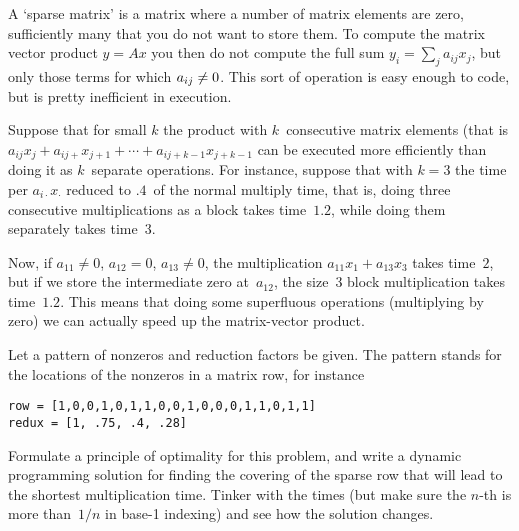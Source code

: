 A `sparse matrix' is a matrix where a number of matrix elements are
zero, sufficiently many that you do not want to store them.
To compute the matrix vector product $y=Ax$ you then do not compute
the full sum $y_i=\sum_j a_{ij}x_j$, but only those terms for which
$a_{ij}\not=\nobreak 0$. This sort of operation is easy enough to
code, but is pretty inefficient in execution.

Suppose that for small $k$ the product with $k$~consecutive matrix
elements (that is
$a_{ij}x_j+a_{ij+}x_{j+1}+\cdots+a_{ij+k-1}x_{j+k-1}$ can be executed
more efficiently than doing it as $k$~separate operations. For
instance, suppose that with $k=3$ the time per $a_{i\cdot}x_\cdot$
reduced to $.4$~of the normal multiply time, that is, doing three
consecutive multiplications as a block takes time~$1.2$, while doing
them separately takes time~$3$.

Now, if $a_{11}\not=0$, $a_{12}=0$, $a_{13}\not=0$, the multiplication
$a_{11}x_1+a_{13}x_3$ takes time~$2$, but if we store the intermediate
zero at~$a_{12}$, the size~3 block multiplication takes
time~$1.2$. This means that doing some superfluous operations
(multiplying by zero) we can actually speed up the matrix-vector
product.

Let a pattern of nonzeros and reduction factors be given. The pattern
stands for the locations of the nonzeros in a matrix row, for instance
\begin{verbatim}
row = [1,0,0,1,0,1,1,0,0,1,0,0,0,1,1,0,1,1]
redux = [1, .75, .4, .28]
\end{verbatim}
Formulate a
principle of optimality for this problem, and write a dynamic
programming solution for finding the covering of the sparse row that
will lead to the shortest multiplication time. Tinker with the
 times (but make sure the $n$-th is more than~$1/n$ in base-1
indexing) and see how the solution changes.
